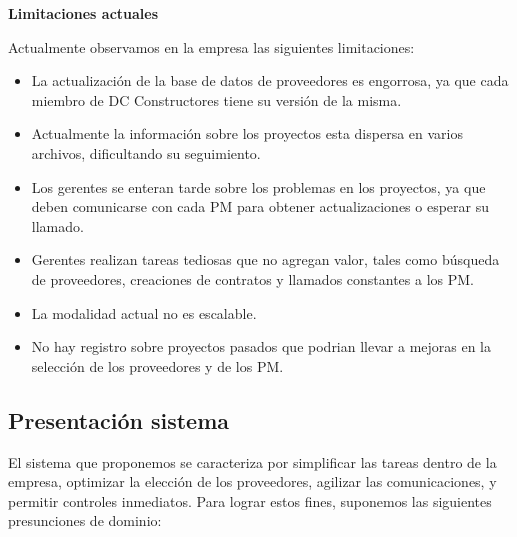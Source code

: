 \textbf{Limitaciones actuales}

Actualmente observamos en la empresa las siguientes limitaciones:
\begin{itemize}
    \item La actualización de la base de datos de proveedores es engorrosa, ya que cada miembro de DC Constructores tiene su versión de la misma.
    \item Actualmente la información sobre los proyectos esta dispersa en varios archivos, dificultando su seguimiento.
    \item Los gerentes se enteran tarde sobre los problemas en los proyectos, ya que deben comunicarse con cada PM para obtener actualizaciones o esperar su llamado.
    \item Gerentes realizan tareas tediosas que no agregan valor, tales como búsqueda de proveedores, creaciones de contratos y llamados constantes a los PM.
    \item La modalidad actual no es escalable.
    \item No hay registro sobre proyectos pasados que podrian llevar a mejoras en la selección de los proveedores y de los PM.
\end{itemize}

\subsection{Presentación sistema}
El sistema que proponemos se caracteriza por simplificar las tareas dentro de la empresa, optimizar la elección de los proveedores, agilizar las comunicaciones, y permitir controles inmediatos. Para lograr estos fines, suponemos las siguientes presunciones de dominio:

